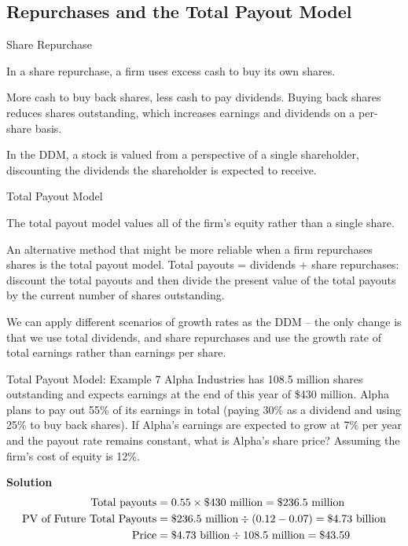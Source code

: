 \documentclass[9pt,aspectratio=169]{beamer}
\newcommand{\keypoint}[1]{%
  \par\noindent
  \begingroup
  \usebeamercolor{keypoint}%
  \setlength{\fboxsep}{7pt}%
  \colorbox{bg}{\parbox{\dimexpr\linewidth-2\fboxsep\relax}{\color{fg}#1}}%
  \endgroup
  \par\medskip}
\begin{document}
\subsection{Repurchases and the Total Payout Model}
\begin{frame}{Share Repurchase}
\keypoint{In a share repurchase, a firm uses excess cash to buy its own shares.}

More cash to buy back shares, less cash to pay dividends. Buying back shares reduces
shares outstanding, which increases earnings and dividends on a per-share basis.

\vspace{0.5em}
In the DDM, a stock is valued from a perspective of a single shareholder, discounting the
dividends the shareholder is expected to receive.
\end{frame}


\begin{frame}{Total Payout Model}
\keypoint{The total payout model values all of the firm's equity rather than a single
share.}

An alternative method that might be more reliable when a firm repurchases shares is the
total payout model. Total payouts = dividends + share repurchases: discount the total
payouts and then divide the present value of the total payouts by the current number of
shares outstanding.

\vspace{0.5em}
We can apply different scenarios of growth rates as the DDM -- the only change is that we
use total dividends, and share repurchases and use the growth rate of total earnings
rather than earnings per share.
\end{frame}


\begin{frame}{Total Payout Model: Example 7}
Alpha Industries has 108.5 million shares outstanding and expects earnings at the end of this year of \$430 million. Alpha plans to pay out 55\% of its earnings in total (paying 30\% as a dividend and using 25\% to buy back shares). If Alpha's earnings are expected to grow at 7\% per year and the payout rate remains constant, what is Alpha's share price? Assuming the firm's cost of equity is 12\%.

\vspace{0.5cm}
\textbf{Solution}
\begin{align}\nonumber
\text{Total payouts} &= 0.55 \times \$430 \text{ million} = \$236.5 \text{ million} \\\nonumber
\text{PV of Future Total Payouts} &= \$236.5 \text{ million} \div (0.12 - 0.07) = \$4.73 \text{ billion} \\\nonumber
\text{Price} &= \$4.73 \text{ billion} \div 108.5 \text{ million} = \$43.59
\end{align}


\end{frame}
\end{document}
